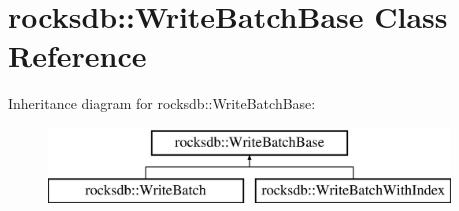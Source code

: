 \hypertarget{classrocksdb_1_1WriteBatchBase}{}\section{rocksdb\+:\+:Write\+Batch\+Base Class Reference}
\label{classrocksdb_1_1WriteBatchBase}
Inheritance diagram for rocksdb\+:\+:Write\+Batch\+Base\+:\begin{figure}[H]
\begin{center}
\leavevmode
\includegraphics[height=2.000000cm]{classrocksdb_1_1WriteBatchBase}
\end{center}
\end{figure}
